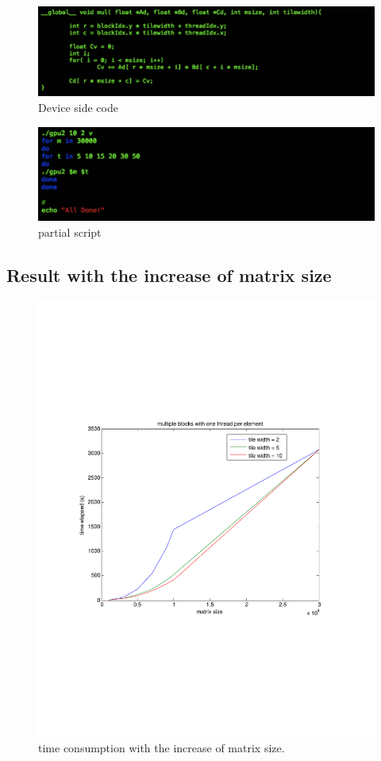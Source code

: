 \documentclass {article}
\begin{document}
\begin{figure}[htp!]
\centering
\includegraphics[width = \linewidth]{gpu22.pdf}
\caption{Device side code}
\label{fig:gpu22}
\end{figure}

\begin{figure}[htp!]
\centering
\includegraphics[width = \linewidth]{gpu23.pdf}
\caption{partial script}
\label{fig:gpu23}
\end{figure}

\subsection{Result with the increase of matrix size}
\begin{figure}[htp!]
\centering
\includegraphics[width=0.8\linewidth]{r_gpu21.pdf}
\caption{time consumption with the increase of matrix size.}
\label{fig:rgpu2}
\end{figure}
\end{document}
